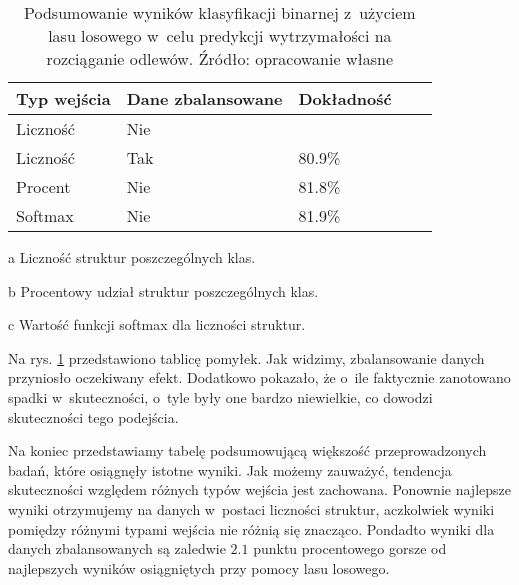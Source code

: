 \begin{table}[!h]
	\centering
	\begin{threeparttable}
		\caption{Podsumowanie wyników klasyfikacji binarnej z~użyciem lasu losowego w~celu predykcji wytrzymałości na rozciąganie odlewów. Źródło: opracowanie własne}
		\label{rfc.binary.summary.table}
		\begin{tabularx}{1\textwidth}{ |X|X|X|X|X| }
		  \hline
		  \textbf{Typ wejścia} & \textbf{Dane zbalansowane} & \textbf{Dokładność}\\

		  \hline
		  Liczność\tnote{a} & Nie  & \bo{83\%} \\

		  \hline
		  Liczność & Tak & 80.9\%\\

		  \hline
  		  Procent\tnote{b} & Nie & 81.8\%\\

	          \hline
  		  Softmax\tnote{c} & Nie & 81.9\%\\

		  \hline
		\end{tabularx}
		\begin{tablenotes}
			\footnotesize
			\item[a] Liczność struktur poszczególnych klas.
			\item[b] Procentowy udział struktur poszczególnych klas.
			\item[c] Wartość funkcji softmax dla liczności struktur.
		\end{tablenotes}
	\end{threeparttable}
\end{table}
Na rys. \ref{rfc.binary.summary.table} przedstawiono tablicę pomyłek. Jak widzimy, zbalansowanie danych przyniosło oczekiwany efekt. Dodatkowo pokazało, że o~ile faktycznie zanotowano spadki w~skuteczności, o~tyle były one bardzo niewielkie, co dowodzi skuteczności tego podejścia. 

Na koniec przedstawiamy tabelę podsumowującą większość przeprowadzonych badań, które osiągnęły istotne wyniki.
Jak możemy zauważyć, tendencja skuteczności względem różnych typów wejścia jest zachowana. Ponownie najlepsze wyniki otrzymujemy na danych w~postaci liczności struktur, aczkolwiek wyniki pomiędzy różnymi typami wejścia nie różnią się znacząco. Pondadto wyniki dla danych zbalansowanych są zaledwie $2.1$ punktu procentowego gorsze od najlepszych wyników osiągniętych przy pomocy lasu losowego. 

